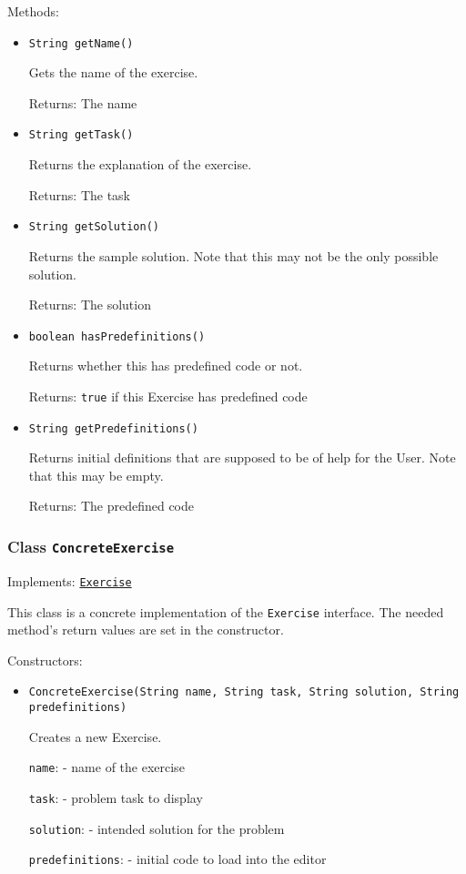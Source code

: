 Methods:
\begin{itemize}
\item \texttt{String getName()}

Gets the name of the exercise.

Returns: The name

\item \texttt{String getTask()}

Returns the explanation of the exercise.

Returns: The task

\item \texttt{String getSolution()}

Returns the sample solution. Note that this may not be the only possible
 solution.

Returns: The solution

\item \texttt{boolean hasPredefinitions()}

Returns whether this has predefined code or not.

Returns: \texttt{true} if this Exercise has predefined code

\item \texttt{String getPredefinitions()}

Returns initial definitions that are supposed to be of help for the User.
 Note that this may be empty.

Returns: The predefined code

\end{itemize}

\subsubsection{Class \texttt{ConcreteExercise}}
\label{type:edu.kit.wavelength.client.view.exercise.ConcreteExercise}
Implements: \texttt{\hyperref[type:edu.kit.wavelength.client.view.exercise.Exercise]{Exercise}}

This class is a concrete implementation of the \texttt{Exercise} interface.
 The needed method's return values are set in the constructor.

Constructors:
\begin{itemize}
\item \texttt{ConcreteExercise(String name, String task, String solution, String predefinitions)}

Creates a new Exercise.

\texttt{name}: - name of the exercise

\texttt{task}: - problem task to display

\texttt{solution}: - intended solution for the problem

\texttt{predefinitions}: - initial code to load into the editor

\end{itemize}

